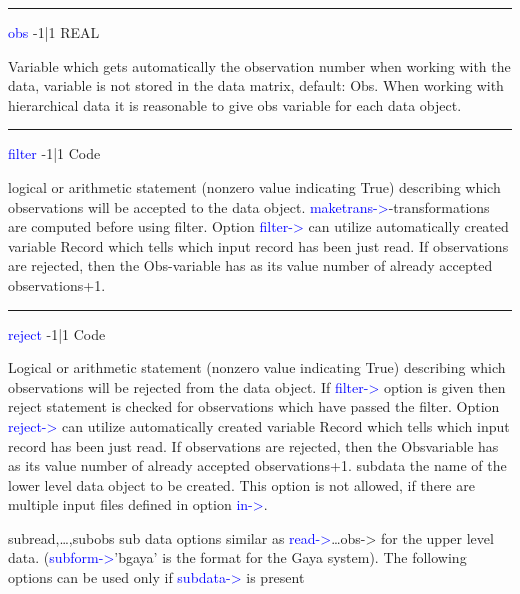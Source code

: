 \hrule
\vspace{0.3cm}
\noindent \textcolor{blue}{obs} \tabto{3cm} -1|1 \tabto{5cm}  REAL \tabto{7cm}
\begin{changemargin}{3cm}{0cm}
\noindent  Variable which gets automatically the observation number when working with the
data, variable is not stored in the data matrix, default: Obs. When working with
hierarchical data it is reasonable to give obs variable for each data object.

\end{changemargin}
\vspace{0.3cm}
\hrule
\vspace{0.3cm}
\noindent \textcolor{blue}{filter} \tabto{3cm} -1|1 \tabto{5cm}  Code \tabto{7cm}
\begin{changemargin}{3cm}{0cm}
\noindent  logical or arithmetic statement (nonzero value indicating True) describing which
observations will be accepted to the data object. \textcolor{blue}{maketrans->}-transformations are
computed before using filter. Option \textcolor{blue}{filter->} can utilize automatically created
variable Record which tells which input record has been just read. If observations
are rejected, then the Obs-variable has as its value number of already accepted
observations+1.

\end{changemargin}
\vspace{0.3cm}
\hrule
\vspace{0.3cm}
\noindent \textcolor{blue}{reject}  \tabto{3cm} -1|1 \tabto{5cm}  Code \tabto{7cm}
\begin{changemargin}{3cm}{0cm}
\noindent  Logical or arithmetic statement (nonzero value indicating True) describing which
observations will be rejected from the data object. If \textcolor{blue}{filter->} option is given then
reject statement is checked for observations which have passed the filter. Option
\textcolor{blue}{reject->} can utilize automatically created variable Record which tells which
input record has been just read. If observations are rejected, then the Obsvariable has as its value number of already accepted observations+1.
subdata the name of the lower level data object to be created. This option is not allowed, if
there are multiple input files defined in option \textcolor{blue}{in->}.

subread,…,subobs sub data options similar as \textcolor{blue}{read->}…obs-> for the upper level data.
(\textcolor{blue}{subform->}'bgaya' is the format for the Gaya system). The following options
can be used only if \textcolor{blue}{subdata->} is present

\end{changemargin}
